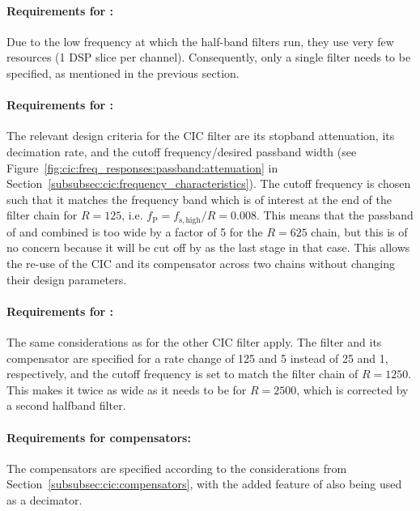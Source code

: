 \paragraph{Requirements for :} Due to  the low frequency at which
the half-band filters run, they use  very few resources (\num{1} DSP slice per
channel).   Consequently, only  a  single  filter needs  to  be specified,  as
mentioned in the previous section.

\paragraph{Requirements     for     :} The     relevant     design
criteria    for   the    CIC    filter   are    its   stopband    attenuation,
its   decimation    rate,   and   the   cutoff    frequency/desired   passband
width    (see   Figure~\ref{fig:cic:freq_responses:passband:attenuation}    in
Section~\ref{subsubsec:cic:frequency_characteristics}).  The  cutoff frequency
is chosen such that it matches the  frequency band which is of interest at the
end of the filter chain  for $R=125$, i.e. $f_\mathrm{P} = f_\mathrm{s,high}/R
=  0.008$. This means  that  the passband  of   and  
combined is too wide by a factor of \num{5} for the $R=625$ chain, but this is
of no concern because it will be cut  off by  as the last stage in
that case. This  allows the re-use of  the CIC and its  compensator across two
chains without changing their design parameters.

\paragraph{Requirements for :} The same considerations as for the
other CIC  filter apply. The filter  and its  compensator are specified  for a
rate  change  of  \num{125}  and  \num{5} instead  of  \num{25}  and  \num{1},
respectively, and  the cutoff frequency  is set to  match the filter  chain of
$R=1250$. This makes it twice as wide as it needs to be for $R=2500$, which is
corrected by a second halfband filter.

\paragraph{Requirements  for  compensators:} The  compensators  are  specified
according to the considerations from Section~\ref{subsubsec:cic:compensators},
with the added feature of  also being used as a decimator.

